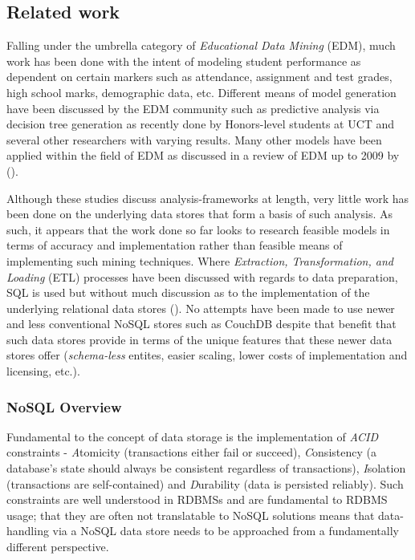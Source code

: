 \subsection{Related work}
Falling under the umbrella category of \textit{Educational Data Mining} (EDM), much work has been done with the intent of modeling student performance as dependent on certain markers such as attendance, assignment and test grades, high school marks, demographic data, etc. Different means of model generation have been discussed by the EDM community such as predictive analysis via decision tree generation as recently done by Honors-level students at UCT \cite{Balestra2017,casper2017} and several other researchers \cite{Qasem20016,Dimitris,zebun2005,Mierle:2005} with varying results. Many other models have been applied within the field of EDM as discussed in a review of EDM up to 2009 by (\cite{bakerEdMiningSummary}).

Although these studies discuss analysis-frameworks at length, very little work has been done on the underlying data stores that form a basis of such analysis. As such, it appears that the work done so far looks to research feasible models in terms of accuracy and implementation rather than feasible means of implementing such mining techniques. Where \textit{Extraction, Transformation, and Loading} (ETL) processes have been discussed with regards to data preparation, SQL is used but without much discussion as to the implementation of the underlying relational data stores (\cite{Balestra2017,casper2017,Mierle:2005}). No attempts have been made to use newer and less conventional NoSQL stores such as CouchDB despite that benefit that such data stores provide in terms of the unique features that these newer data stores offer (\textit{schema-less} entites, easier scaling, lower costs of implementation and licensing, etc.).

\subsubsection*{NoSQL Overview}
Fundamental to the concept of data storage is the implementation of \textit{ACID} constraints - \textit{A}tomicity (transactions either fail or succeed), \textit{C}onsistency (a database's state should always be consistent regardless of transactions), \textit{I}solation (transactions are self-contained) and \textit{D}urability (data is persisted reliably). Such constraints are well understood in RDBMSs and are fundamental to RDBMS usage; that they are often not translatable to NoSQL solutions means that data-handling via a NoSQL data store needs to be approached from a fundamentally different perspective.

